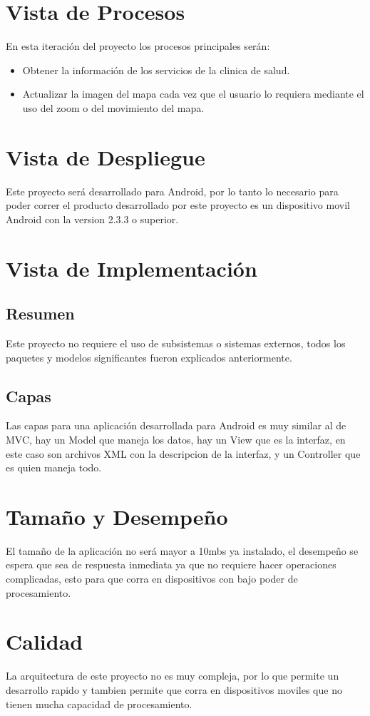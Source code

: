 \documentclass[12pt]{article}
\begin{document}
\section{Vista de Procesos}
En esta iteraci\'on del proyecto los procesos principales ser\'an:

\begin{itemize}
	\item{Obtener la informaci\'on de los servicios de la clinica de salud.}
	\item{Actualizar la imagen del mapa cada vez que el usuario lo requiera mediante el uso del zoom o del movimiento del mapa.}
\end{itemize}

\section{Vista de Despliegue}
Este proyecto ser\'a desarrollado para Android, por lo tanto lo necesario para poder correr el producto desarrollado por este proyecto es un dispositivo movil Android con la version 2.3.3 o superior.

\section{Vista de Implementaci\'on}


\subsection{Resumen}
Este proyecto no requiere el uso de subsistemas o sistemas externos, todos los paquetes y modelos significantes fueron explicados anteriormente.

\subsection{Capas}
Las capas para una aplicaci\'on desarrollada para Android es muy similar al de MVC, hay un Model que maneja los datos, hay un View que es la interfaz, en este caso son archivos XML con la descripcion de la interfaz, y un Controller que es quien maneja todo.


\section{Tama\~no y Desempe\~no}
El tama\~no de la aplicaci\'on no ser\'a mayor a 10mbs ya instalado, el desempe\~no se espera que sea de respuesta inmediata ya que no requiere hacer operaciones complicadas, esto para que corra en dispositivos con bajo poder de procesamiento.

\section{Calidad}
La arquitectura de este proyecto no es muy compleja, por lo que permite un desarrollo rapido y tambien permite que corra en dispositivos moviles que no tienen mucha capacidad de procesamiento.
\end{document}
